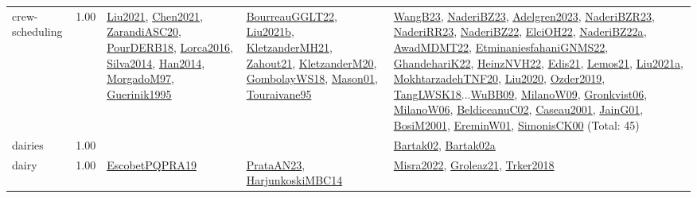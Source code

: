 {\begin{longtable}{p{3cm}r>{\raggedright\arraybackslash}p{6cm}>{\raggedright\arraybackslash}p{6cm}>{\raggedright\arraybackslash}p{8cm}}
\index{crew-scheduling}\index{ApplicationAreas!crew-scheduling}crew-scheduling &  1.00 & \hyperref[detail:Liu2021]{Liu2021}, \hyperref[detail:Chen2021]{Chen2021}, \hyperref[detail:ZarandiASC20]{ZarandiASC20}, \hyperref[detail:PourDERB18]{PourDERB18}, \hyperref[detail:Lorca2016]{Lorca2016}, \hyperref[detail:Silva2014]{Silva2014}, \hyperref[detail:Han2014]{Han2014}, \hyperref[detail:MorgadoM97]{MorgadoM97}, \hyperref[detail:Guerinik1995]{Guerinik1995} & \hyperref[detail:BourreauGGLT22]{BourreauGGLT22}, \hyperref[detail:Liu2021b]{Liu2021b}, \hyperref[detail:KletzanderMH21]{KletzanderMH21}, \hyperref[detail:Zahout21]{Zahout21}, \hyperref[detail:KletzanderM20]{KletzanderM20}, \hyperref[detail:GombolayWS18]{GombolayWS18}, \hyperref[detail:Mason01]{Mason01}, \hyperref[detail:Touraivane95]{Touraivane95} & \hyperref[detail:WangB23]{WangB23}, \hyperref[detail:NaderiBZ23]{NaderiBZ23}, \hyperref[detail:Adelgren2023]{Adelgren2023}, \hyperref[detail:NaderiBZR23]{NaderiBZR23}, \hyperref[detail:NaderiRR23]{NaderiRR23}, \hyperref[detail:NaderiBZ22]{NaderiBZ22}, \hyperref[detail:ElciOH22]{ElciOH22}, \hyperref[detail:NaderiBZ22a]{NaderiBZ22a}, \hyperref[detail:AwadMDMT22]{AwadMDMT22}, \hyperref[detail:EtminaniesfahaniGNMS22]{EtminaniesfahaniGNMS22}, \hyperref[detail:GhandehariK22]{GhandehariK22}, \hyperref[detail:HeinzNVH22]{HeinzNVH22}, \hyperref[detail:Edis21]{Edis21}, \hyperref[detail:Lemos21]{Lemos21}, \hyperref[detail:Liu2021a]{Liu2021a}, \hyperref[detail:MokhtarzadehTNF20]{MokhtarzadehTNF20}, \hyperref[detail:Liu2020]{Liu2020}, \hyperref[detail:Ozder2019]{Ozder2019}, \hyperref[detail:TangLWSK18]{TangLWSK18}...\hyperref[detail:WuBB09]{WuBB09}, \hyperref[detail:MilanoW09]{MilanoW09}, \hyperref[detail:Gronkvist06]{Gronkvist06}, \hyperref[detail:MilanoW06]{MilanoW06}, \hyperref[detail:BeldiceanuC02]{BeldiceanuC02}, \hyperref[detail:Caseau2001]{Caseau2001}, \hyperref[detail:JainG01]{JainG01}, \hyperref[detail:BosiM2001]{BosiM2001}, \hyperref[detail:EreminW01]{EreminW01}, \hyperref[detail:SimonisCK00]{SimonisCK00} (Total: 45)\\
\index{dairies}\index{ApplicationAreas!dairies}dairies &  1.00 &  &  & \hyperref[detail:Bartak02]{Bartak02}, \hyperref[detail:Bartak02a]{Bartak02a}\\
\index{dairy}\index{ApplicationAreas!dairy}dairy &  1.00 & \hyperref[detail:EscobetPQPRA19]{EscobetPQPRA19} & \hyperref[detail:PrataAN23]{PrataAN23}, \hyperref[detail:HarjunkoskiMBC14]{HarjunkoskiMBC14} & \hyperref[detail:Misra2022]{Misra2022}, \hyperref[detail:Groleaz21]{Groleaz21}, \hyperref[detail:Trker2018]{Trker2018}\\

\end{longtable}}
